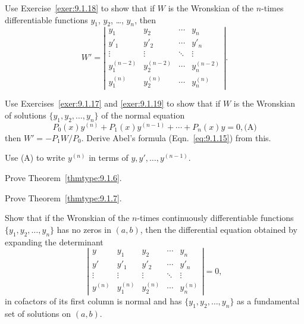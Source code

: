 \documentclass{ximera}
\begin{document}
\begin{problem}\label{exer:9.1.19}
Use Exercise~\ref{exer:9.1.18}  to show that if $W$ is the
Wronskian of the
$n$-times differentiable functions $y_1$, $y_2$, \dots, $y_n$, then
$$
W'=
\left|\begin{array}{cccc}
y_1&y_2&\cdots&y_n\\ 
y'_1&y'_2&\cdots&y'_n\\ 
\vdots&\vdots&\ddots&\vdots\\ 
y_1^{(n-2)}&y_2^{(n-2)}&\cdots&y_n^{(n-2)}\\ 
y_1^{(n)}&y_2^{(n)}&\cdots&y_n^{(n)}
\end{array}\right|.
$$
\end{problem}

\begin{problem}\label{exer:9.1.20}
Use Exercises~\ref{exer:9.1.17} and \ref{exer:9.1.19} to show that if $W$ is
the Wronskian
of  solutions $\{y_1,y_2,\dots,y_n\}$ of the normal equation
$$
P_0(x)y^{(n)}+P_1(x)y^{(n-1)}+\cdots+P_n(x)y=0,
\text{(A)}
$$
then $W'=-P_1W/P_0$.
Derive Abel's formula (Eqn.~\eqref{eq:9.1.15}) from this.
\begin{hint}
Use (A) to write $y^{(n)}$ in terms of
$y,y',\dots,y^{(n-1)}$.
\end{hint}
\end{problem}

\begin{problem}\label{exer:9.1.21}  Prove Theorem~\ref{thmtype:9.1.6}.
\end{problem}

\begin{problem}\label{exer:9.1.22}  Prove Theorem~\ref{thmtype:9.1.7}.
\end{problem}


\begin{problem}\label{exer:9.1.23}
Show that if the Wronskian of the $n$-times continuously
differentiable functions $\{y_1,y_2,\dots,y_n\}$ has no zeros in
$(a,b)$, then the differential equation obtained by expanding the
determinant
$$
\left|\begin{array}{ccccc}
y&y_1&y_2&\cdots&y_n\\ 
y'&y'_1&y'_2&\cdots&y'_n\\ 
\vdots&\vdots&\vdots&\ddots&
 \vdots\\ 
y^{(n)}&y_{1}^{(n)}&y_2^{(n)}&\cdots&y_n^{(n)}
\end{array}\right|=0,
$$
in cofactors of its first column is normal and has
$\{y_1,y_2,\dots,y_n\}$ as a fundamental set of solutions on $(a,b)$.
\end{problem}
\end{document}
